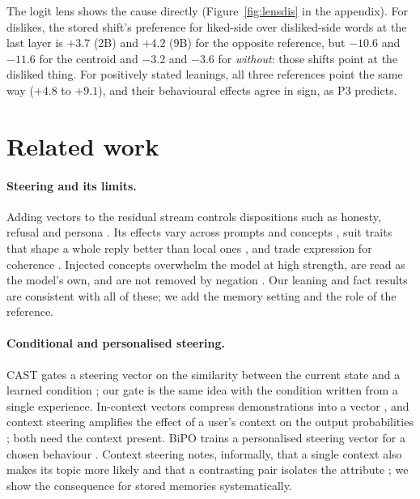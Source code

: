 \documentclass[11pt]{article}
\begin{document}
The logit lens shows the cause directly (Figure~\ref{fig:lensdis} in the appendix). For dislikes, the stored shift's preference for liked-side over disliked-side words at the last layer is $+3.7$ (2B) and $+4.2$ (9B) for the opposite reference, but $-10.6$ and $-11.6$ for the centroid and $-3.2$ and $-3.6$ for \emph{without}: those shifts point at the disliked thing. For positively stated leanings, all three references point the same way ($+4.8$ to $+9.1$), and their behavioural effects agree in sign, as P3 predicts.

\section{Related work}
\label{sec:related}

\paragraph{Steering and its limits.} Adding vectors to the residual stream controls dispositions such as honesty, refusal and persona \citep{turner2023actadd,zou2023repe,rimsky2024caa,cao2024bipo}. Its effects vary across prompts and concepts \citep{tan2024reliability,braun2025unreliability}, suit traits that shape a whole reply better than local ones \citep{subbiah2026limits}, and trade expression for coherence \citep{subbiah2026limits,suri2025memorization}. Injected concepts overwhelm the model at high strength, are read as the model's own, and are not removed by negation \citep{lindsey2026introspection}. Our leaning and fact results are consistent with all of these; we add the memory setting and the role of the reference.

\paragraph{Conditional and personalised steering.} CAST gates a steering vector on the similarity between the current state and a learned condition \citep{lee2025cast}; our gate is the same idea with the condition written from a single experience. In-context vectors compress demonstrations into a vector \citep{liu2024icv}, and context steering amplifies the effect of a user's context on the output probabilities \citep{he2025cos}; both need the context present. BiPO trains a personalised steering vector for a chosen behaviour \citep{cao2024bipo}. Context steering notes, informally, that a single context also makes its topic more likely and that a contrasting pair isolates the attribute \citep{he2025cos}; we show the consequence for stored memories systematically.
\end{document}
